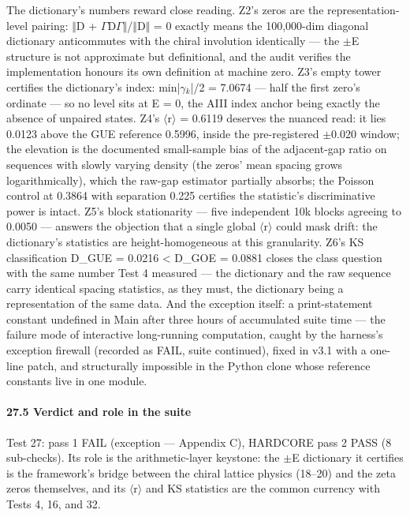 \documentclass[10pt]{article}
\begin{document}
The dictionary's numbers reward close reading. Z2's zeros are the representation-level pairing: $\Vert$D + $\Gamma$D$\Gamma$$\Vert$/$\Vert$D$\Vert$ = 0 exactly means the 100,000-dim diagonal dictionary anticommutes with the chiral involution identically --- the $\pm$E structure is not approximate but definitional, and the audit verifies the implementation honours its own definition at machine zero. Z3's empty tower certifies the dictionary's index: min|$\gamma$$_k$|/2 = 7.0674 --- half the first zero's ordinate --- so no level sits at E = 0, the AIII index anchor being exactly the absence of unpaired states. Z4's $\langle$r$\rangle$ = 0.6119 deserves the nuanced read: it lies 0.0123 above the GUE reference 0.5996, inside the pre-registered $\pm$0.020 window; the elevation is the documented small-sample bias of the adjacent-gap ratio on sequences with slowly varying density (the zeros' mean spacing grows logarithmically), which the raw-gap estimator partially absorbs; the Poisson control at 0.3864 with separation 0.225 certifies the statistic's discriminative power is intact. Z5's block stationarity --- five independent 10k blocks agreeing to 0.0050 --- answers the objection that a single global $\langle$r$\rangle$ could mask drift: the dictionary's statistics are height-homogeneous at this granularity. Z6's KS classification D\_GUE = 0.0216 < D\_GOE = 0.0881 closes the class question with the same number Test 4 measured --- the dictionary and the raw sequence carry identical spacing statistics, as they must, the dictionary being a representation of the same data. And the exception itself: a print-statement constant undefined in Main after three hours of accumulated suite time --- the failure mode of interactive long-running computation, caught by the harness's exception firewall (recorded as FAIL, suite continued), fixed in v3.1 with a one-line patch, and structurally impossible in the Python clone whose reference constants live in one module.

\paragraph{27.5 Verdict and role in the suite}

Test 27: pass 1 FAIL (exception --- Appendix C), HARDCORE pass 2 PASS (8 sub-checks). Its role is the arithmetic-layer keystone: the $\pm$E dictionary it certifies is the framework's bridge between the chiral lattice physics (18--20) and the zeta zeros themselves, and its $\langle$r$\rangle$ and KS statistics are the common currency with Tests 4, 16, and 32.
\end{document}
